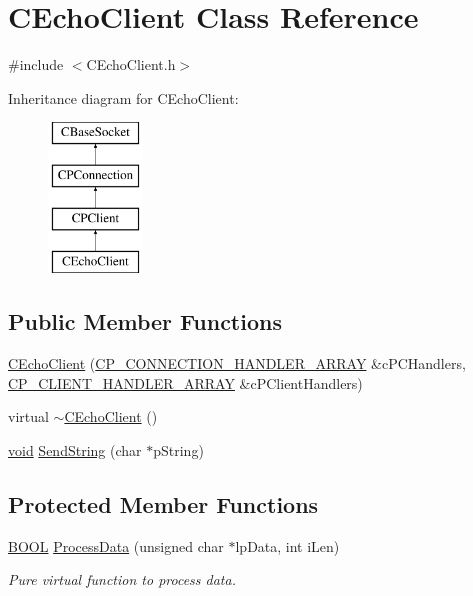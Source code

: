 \hypertarget{class_c_echo_client}{\section{\-C\-Echo\-Client \-Class \-Reference}
\label{class_c_echo_client}
}


{\ttfamily \#include $<$\-C\-Echo\-Client.\-h$>$}

\-Inheritance diagram for \-C\-Echo\-Client\-:\begin{figure}[H]
\begin{center}
\leavevmode
\includegraphics[height=4.000000cm]{class_c_echo_client}
\end{center}
\end{figure}
\subsection*{\-Public \-Member \-Functions}
\begin{DoxyCompactItemize}
\item 
\hyperlink{class_c_echo_client_afb1b50347cc6200df185a1696b88ef57}{\-C\-Echo\-Client} (\hyperlink{_c_p_connection_handler_8h_a05bf2fef946dbf14350a5f45bb28f953}{\-C\-P\-\_\-\-C\-O\-N\-N\-E\-C\-T\-I\-O\-N\-\_\-\-H\-A\-N\-D\-L\-E\-R\-\_\-\-A\-R\-R\-A\-Y} \&c\-P\-C\-Handlers, \hyperlink{_c_p_client_handler_8h_a9babc356867a188aa505ce2ce4a81c46}{\-C\-P\-\_\-\-C\-L\-I\-E\-N\-T\-\_\-\-H\-A\-N\-D\-L\-E\-R\-\_\-\-A\-R\-R\-A\-Y} \&c\-P\-Client\-Handlers)
\item 
virtual \hyperlink{class_c_echo_client_a96ca31a53e72940a5aa33905853182d3}{$\sim$\-C\-Echo\-Client} ()
\item 
\hyperlink{_cpclient_8h_a6464f7480a0fd0ee170cba12b2c0497f}{void} \hyperlink{class_c_echo_client_ad25eb3f1a3cbb2e25fd65b20a5f505ce}{\-Send\-String} (char $\ast$p\-String)
\end{DoxyCompactItemize}
\subsection*{\-Protected \-Member \-Functions}
\begin{DoxyCompactItemize}
\item 
\hyperlink{_cpclient_8h_a3be13892ae7076009afcf121347dd319}{\-B\-O\-O\-L} \hyperlink{class_c_echo_client_aa4b137b9fab962746d02b70a94a400a8}{\-Process\-Data} (unsigned char $\ast$lp\-Data, int i\-Len)
\begin{DoxyCompactList}\small\item\em \-Pure virtual function to process data. \end{DoxyCompactList}\end{DoxyCompactItemize}
